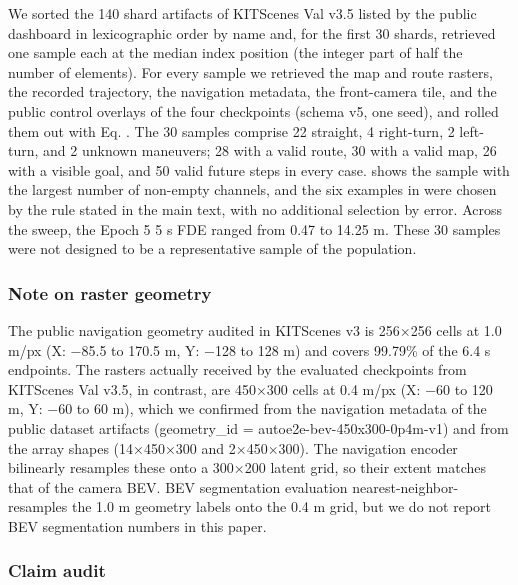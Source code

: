 \documentclass[
  english,
  10pt,
]{article}
\begin{document}
We sorted the 140 shard artifacts of KITScenes Val v3.5 listed by the
public dashboard in lexicographic order by name and, for the first 30
shards, retrieved one sample each at the median index position (the
integer part of half the number of elements). For every sample we
retrieved the map and route rasters, the recorded trajectory, the
navigation metadata, the front-camera tile, and the public control
overlays of the four checkpoints (schema v5, one seed), and rolled them
out with Eq. \hyperref[eq-roll]{}. The 30 samples comprise 22 straight,
4 right-turn, 2 left-turn, and 2 unknown maneuvers; 28 with a valid
route, 30 with a valid map, 26 with a visible goal, and 50 valid future
steps in every case. \hyperref[fig-channels]{}shows the sample with the
largest number of non-empty channels, and the six examples in
\hyperref[fig-qual]{}were chosen by the rule stated in the main text,
with no additional selection by error. Across the sweep, the Epoch 5 5 s
FDE ranged from 0.47 to 14.25 m. These 30 samples were not designed to
be a representative sample of the population.

\subsubsection{Note on raster geometry}\label{note-on-raster-geometry}

The public navigation geometry audited in KITScenes v3 is 256×256 cells
at 1.0 m/px (X: −85.5 to 170.5 m, Y: −128 to 128 m) and covers 99.79\%
of the 6.4 s endpoints. The rasters actually received by the evaluated
checkpoints from KITScenes Val v3.5, in contrast, are 450×300 cells at
0.4 m/px (X: −60 to 120 m, Y: −60 to 60 m), which we confirmed from the
navigation metadata of the public dataset artifacts (geometry\_id =
autoe2e-bev-450x300-0p4m-v1) and from the array shapes (14×450×300 and
2×450×300). The navigation encoder bilinearly resamples these onto a
300×200 latent grid, so their extent matches that of the camera BEV. BEV
segmentation evaluation nearest-neighbor-resamples the 1.0 m geometry
labels onto the 0.4 m grid, but we do not report BEV segmentation
numbers in this paper.

\subsubsection{Claim audit}\label{claim-audit}
\end{document}
